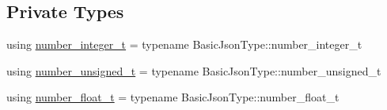\subsection*{Private Types}
\begin{DoxyCompactItemize}
\item 
using \hyperlink{classnlohmann_1_1detail_1_1lexer_a9cd1b11cc67edbfb2613c788b5bd337c}{number\+\_\+integer\+\_\+t} = typename Basic\+Json\+Type\+::number\+\_\+integer\+\_\+t
\item 
using \hyperlink{classnlohmann_1_1detail_1_1lexer_a105d1dfeab414a572655895cdd96a52a}{number\+\_\+unsigned\+\_\+t} = typename Basic\+Json\+Type\+::number\+\_\+unsigned\+\_\+t
\item 
using \hyperlink{classnlohmann_1_1detail_1_1lexer_aa7f9e7b2bcd311fb86e2da43761a6619}{number\+\_\+float\+\_\+t} = typename Basic\+Json\+Type\+::number\+\_\+float\+\_\+t
\end{DoxyCompactItemize}
